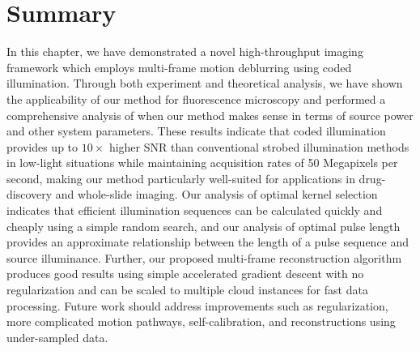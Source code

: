 \section{Summary}
In this chapter, we have demonstrated a novel high-throughput imaging framework which employs multi-frame motion deblurring using coded illumination. Through both experiment and theoretical analysis, we have shown the applicability of our method for fluorescence microscopy and performed a comprehensive analysis of when our method makes sense in terms of source power and other system parameters. These results indicate that coded illumination provides up to $10\times$ higher SNR than conventional strobed illumination methods in low-light situations while maintaining acquisition rates of 50 Megapixels per second, making our method particularly well-suited for applications in drug-discovery and whole-slide imaging. Our analysis of optimal kernel selection indicates that efficient illumination sequences can be calculated quickly and cheaply using a simple random search, and our analysis of optimal pulse length provides an approximate relationship between the length of a pulse sequence and source illuminance. Further, our proposed multi-frame reconstruction algorithm produces good results using simple accelerated gradient descent with no regularization and can be scaled to multiple cloud instances for fast data processing. Future work should address improvements such as regularization, more complicated motion pathways, self-calibration, and reconstructions using under-sampled data.
